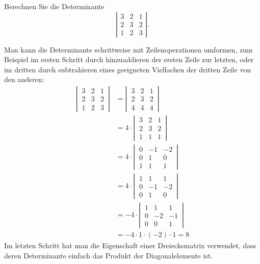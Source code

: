 Berechnen Sie die Determinante
\[
\left|\begin{matrix}
3&2&1\\
2&3&2\\
1&2&3
\end{matrix}\right|
.
\]


\begin{loesung}
Man kann die Determinante schrittweise mit Zeilenoperationen umformen,
zum Beispiel im ersten Schritt durch hinzuaddieren der ersten Zeile
zur letzten, oder im dritten durch subtrahieren eines geeigneten
Vielfachen der dritten Zeile von den anderen:
\begin{align*}
\left|\,\begin{matrix}
3&2&1\\
2&3&2\\
1&2&3
\end{matrix}\,\right|
&=
\left|\,\begin{matrix}
3&2&1\\
2&3&2\\
4&4&4
\end{matrix}\,\right|
\\&=
4\cdot \left|\,\begin{matrix}
3&2&1\\
2&3&2\\
1&1&1
\end{matrix}\,\right|
\\&=
4\cdot \left|\,\begin{matrix}
0&-1&-2\\
0& 1& 0\\
1& 1& 1
\end{matrix}\,\right|
\\&=
4\cdot \left|\,\begin{matrix}
1& 1& 1\\
0&-1&-2\\
0& 1& 0
\end{matrix}\,\right|
\\&=
-4\cdot \left|\,\begin{matrix}
1& 1& 1\\
0&-2&-1\\
0& 0& 1
\end{matrix}\,\right|
\\&=
-4\cdot 1\cdot (-2)\cdot 1=8
\end{align*}
Im letzten Schritt hat man die Eigenschaft einer Dreiecksmatrix verwendet,
dass deren Determinante einfach das Produkt der Diagonalelemente ist.


\end{loesung}
